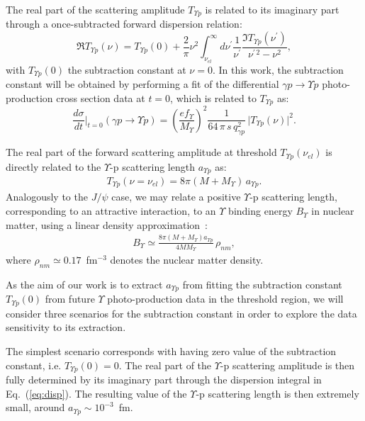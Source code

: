 \documentclass[prd,amsmath,%
twocolumn,floatfix,amssymb, preprintnumbers, linenumbers,nofootinbib, superscriptaddress]{revtex4}
\newcommand{\beq}{\begin{equation}}
\newcommand{\eeq}{\end{equation}}
\newcommand{\bea}{\begin{eqnarray}}
\newcommand{\eea}{\end{eqnarray}}
\begin{document}
The real part of the scattering amplitude $T_{\Upsilon p}$ is related to its imaginary part
through a once-subtracted forward dispersion relation:
\beq
\Re T_{\Upsilon p}(\nu) = T_{\Upsilon p}(0) + \frac{2}{\pi} \nu^2 \int_{\nu_{el}}^\infty d
\nu^\prime \frac{1}{\nu^\prime} \frac{\Im T_{\Upsilon p}(\nu^\prime)}{\nu^{\prime \, 2} - \nu^2},
\label{eq:disp}
\eeq
with $T_{\Upsilon p}(0) $ the subtraction constant at $\nu = 0$. In this work, the subtraction constant will be obtained by performing a fit of the 
differential $\gamma p \to \Upsilon p$  photo-production cross section data at $t=0$, which is related to $T_{\Upsilon p}$ as:
\beq
\frac{d \sigma}{dt} \biggr|_{t = 0} (\gamma p \to \Upsilon p) 
= \left( \frac{e f_\Upsilon}{M_\Upsilon} \right)^2  \frac{1}{64 \, \pi \, s \, q_{\gamma p}^2} \, \big| T_{\Upsilon p}(\nu) \big|^2.
\label{eq:dsigmadt0_gapjpsip}
\eeq

The real part of the forward scattering amplitude at threshold $T_{\Upsilon p}(\nu_{el}) $ is directly related to the $\Upsilon$-p scattering length 
$a_{\Upsilon p}$ as:
\bea
T_{\Upsilon p}(\nu = \nu_{el}) = 8 \pi (M + M_\Upsilon) \, a_{\Upsilon p}. 
\eea
Analogously to the $J/\psi$ case, 
we may relate a positive $\Upsilon$-p scattering length, corresponding to an attractive interaction, 
to an $\Upsilon$ binding energy $B_\Upsilon$ in nuclear matter, using a linear density approximation~\cite{Kaidalov:1992hd}:
\begin{eqnarray}
B_\Upsilon \simeq \frac{8 \pi (M + M_\Upsilon) a_{\Upsilon p}}{4 M M_\Upsilon} \, \rho_{nm},
\label{eq:nmbe}
\end{eqnarray}
where $\rho_{nm} \simeq 0.17$~fm$^{-3}$ denotes the nuclear matter density.

As the aim of our work is to extract $a_{\Upsilon p}$ from fitting the subtraction constant $T_{\Upsilon p}(0)$ from future $\Upsilon$ photo-production data in the threshold region, we will consider three scenarios for the subtraction constant in order to explore the data sensitivity to its extraction. 

The simplest scenario corresponds with having zero value of the subtraction constant, i.e. $T_{\Upsilon p}(0) = 0$. The real part of the $\Upsilon$-p  scattering amplitude is then fully determined by its imaginary part through the dispersion integral 
in Eq.~(\ref{eq:disp}). The resulting value of the $\Upsilon$-p scattering length is then extremely small, around $a_{\Upsilon p} \sim 10^{-3}$~fm. 
\end{document}
